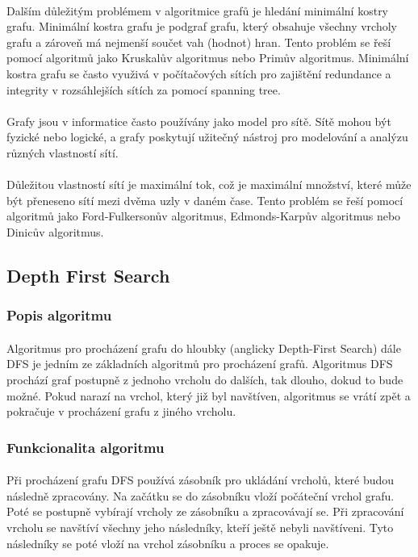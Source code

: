 \documentclass[12pt]{article}
\begin{document}
\paragraph{}
Dalším důležitým problémem v algoritmice grafů je hledání minimální kostry grafu. Minimální 
kostra grafu je podgraf grafu, který obsahuje všechny vrcholy grafu a zároveň má nejmenší 
součet vah (hodnot) hran. Tento problém se řeší pomocí algoritmů jako Kruskalův algoritmus nebo Primův 
algoritmus. Minimální kostra grafu se často využivá v počítačových sítích pro zajištění redundance
a integrity v rozsáhlejších sítích za pomocí spanning tree.
\paragraph{}
Grafy jsou v informatice často používány jako model pro sítě. Sítě mohou být fyzické nebo 
logické, a grafy poskytují užitečný nástroj pro modelování a analýzu různých vlastností sítí.
\paragraph{}
Důležitou vlastností sítí je maximální tok, což je maximální množství, které může být přeneseno 
sítí mezi dvěma uzly v daném čase. Tento problém se řeší pomocí algoritmů jako Ford-Fulkersonův 
algoritmus, Edmonds-Karpův algoritmus nebo Dinicův algoritmus.

\subsection{Depth First Search}
\subsubsection{Popis algoritmu}
\paragraph{}
Algoritmus pro procházení grafu do hloubky (anglicky Depth-First Search) dále DFS
je jedním ze základních algoritmů pro procházení grafů. Algoritmus DFS prochází 
graf postupně z jednoho vrcholu do dalších, tak dlouho, dokud to bude možné. 
Pokud narazí na vrchol, který již byl navštíven, algoritmus se vrátí zpět a pokračuje 
v procházení grafu z jiného vrcholu.
\subsubsection{Funkcionalita algoritmu}
\paragraph{}
Při procházení grafu DFS používá zásobník pro ukládání vrcholů, které budou následně 
zpracovány. Na začátku se do zásobníku vloží počáteční vrchol grafu. Poté se postupně 
vybírají vrcholy ze zásobníku a zpracovávají se. Při zpracování vrcholu se navštíví 
všechny jeho následníky, kteří ještě nebyli navštíveni. Tyto následníky se poté vloží 
na vrchol zásobníku a proces se opakuje. 
\end{document}
